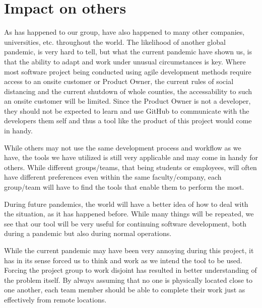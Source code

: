 \section{Impact on others}\label{sec:impactOnOthers}
As has happened to our group, have also happened to many other companies, universities, etc. throughout the world.
The likelihood of another global pandemic, is very hard to tell, but what the current pandemic have shown us, is that the ability to adapt and work under unusual circumstances is key.
Where most software project being conducted using agile development methods require access to an onsite customer or Product Owner, the current rules of social distancing and the current shutdown of whole counties, the accessability to such an onsite customer will be limited.
Since the Product Owner is not a developer, they should not be expected to learn and use GitHub to communicate with the developers them self and thus a tool like the product of this project would come in handy.

While others may not use the same development process and workflow as we have, the tools we have utilized is still very applicable and may come in handy for others.
While different groups/teams, that being students or employees, will often have different preferences even within the same faculty/company, each group/team will have to find the tools that enable them to perform the most.

During future pandemics, the world will have a better idea of how to deal with the situation, as it has happened before.
While many things will be repeated, we see that our tool will be very useful for continuing software development, both during a pandemic but also during normal operations.

While the current pandemic may have been very annoying during this project, it has in its sense forced us to think and work as we intend the tool to be used.
Forcing the project group to work disjoint has resulted in better understanding of the problem itself.
By always assuming that no one is physically located close to one another, each team member should be able to complete their work just as effectively from remote locations.

